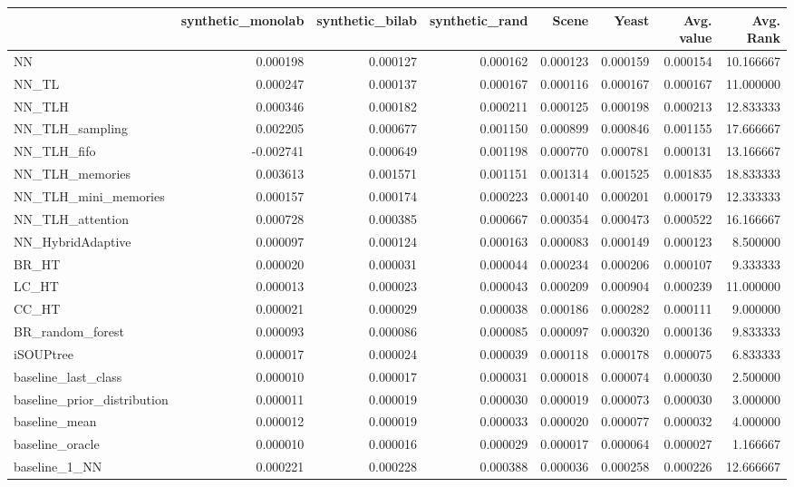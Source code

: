 \begin{tabular}{lrrrrrrr}
\toprule
 & synthetic_monolab & synthetic_bilab & synthetic_rand & Scene & Yeast & Avg. value & Avg. Rank \\
\midrule
NN & 0.000198 & 0.000127 & 0.000162 & 0.000123 & 0.000159 & 0.000154 & 10.166667 \\
NN_TL & 0.000247 & 0.000137 & 0.000167 & 0.000116 & 0.000167 & 0.000167 & 11.000000 \\
NN_TLH & 0.000346 & 0.000182 & 0.000211 & 0.000125 & 0.000198 & 0.000213 & 12.833333 \\
NN_TLH_sampling & 0.002205 & 0.000677 & 0.001150 & 0.000899 & 0.000846 & 0.001155 & 17.666667 \\
NN_TLH_fifo & -0.002741 & 0.000649 & 0.001198 & 0.000770 & 0.000781 & 0.000131 & 13.166667 \\
NN_TLH_memories & 0.003613 & 0.001571 & 0.001151 & 0.001314 & 0.001525 & 0.001835 & 18.833333 \\
NN_TLH_mini_memories & 0.000157 & 0.000174 & 0.000223 & 0.000140 & 0.000201 & 0.000179 & 12.333333 \\
NN_TLH_attention & 0.000728 & 0.000385 & 0.000667 & 0.000354 & 0.000473 & 0.000522 & 16.166667 \\
NN_HybridAdaptive & 0.000097 & 0.000124 & 0.000163 & 0.000083 & 0.000149 & 0.000123 & 8.500000 \\
BR_HT & 0.000020 & 0.000031 & 0.000044 & 0.000234 & 0.000206 & 0.000107 & 9.333333 \\
LC_HT & 0.000013 & 0.000023 & 0.000043 & 0.000209 & 0.000904 & 0.000239 & 11.000000 \\
CC_HT & 0.000021 & 0.000029 & 0.000038 & 0.000186 & 0.000282 & 0.000111 & 9.000000 \\
BR_random_forest & 0.000093 & 0.000086 & 0.000085 & 0.000097 & 0.000320 & 0.000136 & 9.833333 \\
iSOUPtree & 0.000017 & 0.000024 & 0.000039 & 0.000118 & 0.000178 & 0.000075 & 6.833333 \\
baseline_last_class & 0.000010 & 0.000017 & 0.000031 & 0.000018 & 0.000074 & 0.000030 & 2.500000 \\
baseline_prior_distribution & 0.000011 & 0.000019 & 0.000030 & 0.000019 & 0.000073 & 0.000030 & 3.000000 \\
baseline_mean & 0.000012 & 0.000019 & 0.000033 & 0.000020 & 0.000077 & 0.000032 & 4.000000 \\
baseline_oracle & 0.000010 & 0.000016 & 0.000029 & 0.000017 & 0.000064 & 0.000027 & 1.166667 \\
baseline_1_NN & 0.000221 & 0.000228 & 0.000388 & 0.000036 & 0.000258 & 0.000226 & 12.666667 \\
\bottomrule
\end{tabular}
